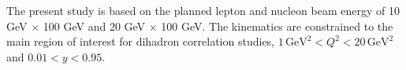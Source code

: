 %
%
%
%



The present study is based on the planned lepton and nucleon beam energy of 10
GeV $\times$ 100 GeV and 20 GeV $\times$ 100 GeV. The kinematics are constrained
to the main region of interest for dihadron correlation studies,
$1\, \textrm{GeV}^{2}<Q^{2}<20 \, \textrm{GeV}^{2}$ and
$0.01<y<0.95$. 

